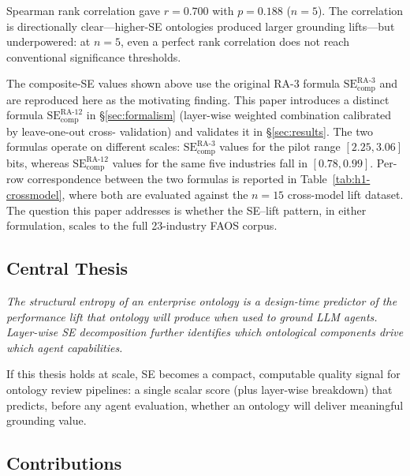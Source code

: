 \documentclass[11pt,a4paper]{article}
\newcommand{\faos}{\textsc{FAOS}}
\newcommand{\se}{\mathrm{SE}}
\newcommand{\secomp}{\se_{\text{comp}}}
\begin{document}
\noindent Spearman rank correlation gave $r = 0.700$ with $p = 0.188$
($n = 5$). The correlation is directionally clear---higher-SE ontologies
produced larger grounding lifts---but underpowered: at $n = 5$, even a
perfect rank correlation does not reach conventional significance
thresholds.

The composite-SE values shown above use the original RA-3 formula
$\secomp^{\text{RA-3}}$ \citep{luong2026neurosymbolic} and are
reproduced here as the motivating finding. This paper introduces a
distinct formula $\secomp^{\text{RA-12}}$ in \S\ref{sec:formalism}
(layer-wise weighted combination calibrated by leave-one-out cross-%
validation) and validates it in \S\ref{sec:results}. The two formulas
operate on different scales: $\secomp^{\text{RA-3}}$ values for the
pilot range $[2.25, 3.06]$ bits, whereas $\secomp^{\text{RA-12}}$
values for the same five industries fall in $[0.78, 0.99]$. Per-row
correspondence between the two formulas is reported in
Table~\ref{tab:h1-crossmodel}, where both are evaluated against the
$n=15$ cross-model lift dataset. The question this paper addresses is
whether the SE--lift pattern, in either formulation, scales to the
full 23-industry \faos{} corpus.

\subsection{Central Thesis}

\emph{The structural entropy of an enterprise ontology is a design-time
predictor of the performance lift that ontology will produce when used
to ground LLM agents. Layer-wise SE decomposition further identifies
which ontological components drive which agent capabilities.}

If this thesis holds at scale, SE becomes a compact, computable quality
signal for ontology review pipelines: a single scalar score (plus
layer-wise breakdown) that predicts, before any agent evaluation, whether
an ontology will deliver meaningful grounding value.

\subsection{Contributions}
\end{document}
